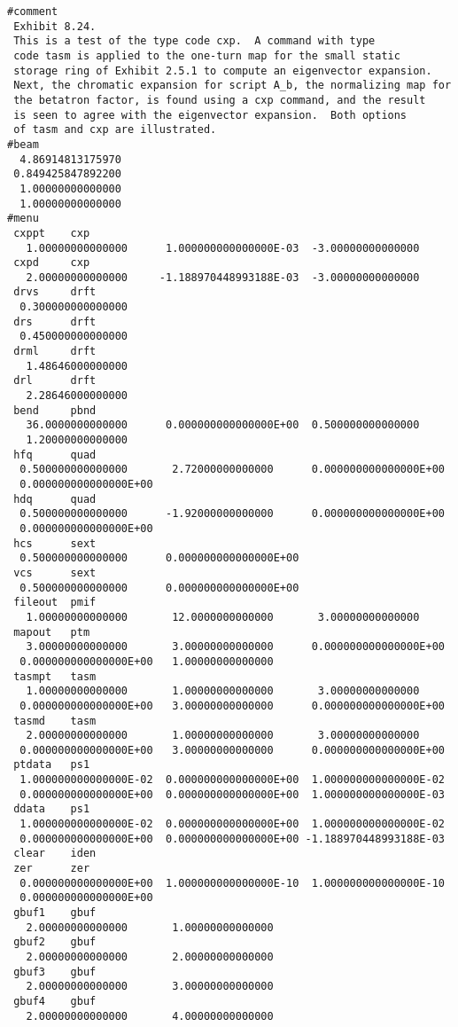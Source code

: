 \vspace{5mm}
\begin{footnotesize}
\begin{verbatim}
#comment
 Exhibit 8.24.
 This is a test of the type code cxp.  A command with type
 code tasm is applied to the one-turn map for the small static
 storage ring of Exhibit 2.5.1 to compute an eigenvector expansion.
 Next, the chromatic expansion for script A_b, the normalizing map for
 the betatron factor, is found using a cxp command, and the result
 is seen to agree with the eigenvector expansion.  Both options
 of tasm and cxp are illustrated.
#beam
  4.86914813175970
 0.849425847892200
  1.00000000000000
  1.00000000000000
#menu
 cxppt    cxp
   1.00000000000000      1.000000000000000E-03  -3.00000000000000
 cxpd     cxp
   2.00000000000000     -1.188970448993188E-03  -3.00000000000000
 drvs     drft
  0.300000000000000
 drs      drft
  0.450000000000000
 drml     drft
   1.48646000000000
 drl      drft
   2.28646000000000
 bend     pbnd
   36.0000000000000      0.000000000000000E+00  0.500000000000000
   1.20000000000000
 hfq      quad
  0.500000000000000       2.72000000000000      0.000000000000000E+00
  0.000000000000000E+00
 hdq      quad
  0.500000000000000      -1.92000000000000      0.000000000000000E+00
  0.000000000000000E+00
 hcs      sext
  0.500000000000000      0.000000000000000E+00
 vcs      sext
  0.500000000000000      0.000000000000000E+00
 fileout  pmif
   1.00000000000000       12.0000000000000       3.00000000000000
 mapout   ptm
   3.00000000000000       3.00000000000000      0.000000000000000E+00
  0.000000000000000E+00   1.00000000000000
 tasmpt   tasm
   1.00000000000000       1.00000000000000       3.00000000000000
  0.000000000000000E+00   3.00000000000000      0.000000000000000E+00
 tasmd    tasm
   2.00000000000000       1.00000000000000       3.00000000000000
  0.000000000000000E+00   3.00000000000000      0.000000000000000E+00
 ptdata   ps1
  1.000000000000000E-02  0.000000000000000E+00  1.000000000000000E-02
  0.000000000000000E+00  0.000000000000000E+00  1.000000000000000E-03
 ddata    ps1
  1.000000000000000E-02  0.000000000000000E+00  1.000000000000000E-02
  0.000000000000000E+00  0.000000000000000E+00 -1.188970448993188E-03
 clear    iden
 zer      zer
  0.000000000000000E+00  1.000000000000000E-10  1.000000000000000E-10
  0.000000000000000E+00
 gbuf1    gbuf
   2.00000000000000       1.00000000000000
 gbuf2    gbuf
   2.00000000000000       2.00000000000000
 gbuf3    gbuf
   2.00000000000000       3.00000000000000
 gbuf4    gbuf
   2.00000000000000       4.00000000000000

\end{verbatim}
\end{footnotesize}
